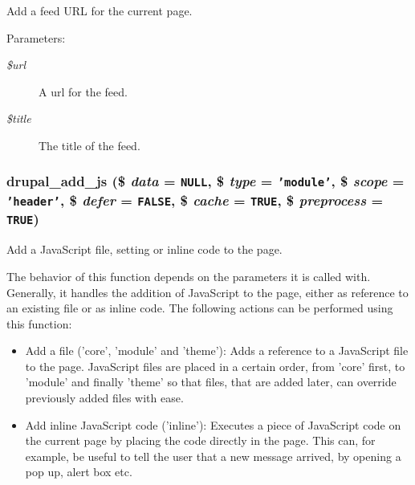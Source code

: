 Add a feed URL for the current page.

\begin{Desc}
\item[Parameters:]
\begin{description}
\item[{\em \$url}]A url for the feed. \item[{\em \$title}]The title of the feed. \end{description}
\end{Desc}
\hypertarget{common_8inc_a20ac74a08756427706432aa6bb33139}{
\subsubsection[{drupal\_\-add\_\-js}]{\setlength{\rightskip}{0pt plus 5cm}drupal\_\-add\_\-js (\$ {\em data} = {\tt NULL}, \/  \$ {\em type} = {\tt 'module'}, \/  \$ {\em scope} = {\tt 'header'}, \/  \$ {\em defer} = {\tt FALSE}, \/  \$ {\em cache} = {\tt TRUE}, \/  \$ {\em preprocess} = {\tt TRUE})}}
\label{common_8inc_a20ac74a08756427706432aa6bb33139}


Add a JavaScript file, setting or inline code to the page.

The behavior of this function depends on the parameters it is called with. Generally, it handles the addition of JavaScript to the page, either as reference to an existing file or as inline code. The following actions can be performed using this function:

\begin{itemize}
\item Add a file ('core', 'module' and 'theme'): Adds a reference to a JavaScript file to the page. JavaScript files are placed in a certain order, from 'core' first, to 'module' and finally 'theme' so that files, that are added later, can override previously added files with ease.\end{itemize}


\begin{itemize}
\item Add inline JavaScript code ('inline'): Executes a piece of JavaScript code on the current page by placing the code directly in the page. This can, for example, be useful to tell the user that a new message arrived, by opening a pop up, alert box etc.\end{itemize}


